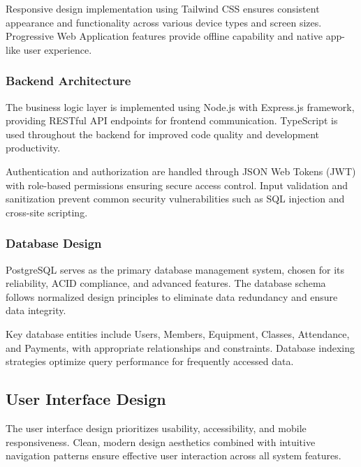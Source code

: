 \documentclass[12pt,a4paper]{report}
\begin{document}
Responsive design implementation using Tailwind CSS ensures consistent appearance and functionality across various device types and screen sizes. Progressive Web Application features provide offline capability and native app-like user experience.

\subsubsection{Backend Architecture}

The business logic layer is implemented using Node.js with Express.js framework, providing RESTful API endpoints for frontend communication. TypeScript is used throughout the backend for improved code quality and development productivity.

Authentication and authorization are handled through JSON Web Tokens (JWT) with role-based permissions ensuring secure access control. Input validation and sanitization prevent common security vulnerabilities such as SQL injection and cross-site scripting.

\subsubsection{Database Design}

PostgreSQL serves as the primary database management system, chosen for its reliability, ACID compliance, and advanced features. The database schema follows normalized design principles to eliminate data redundancy and ensure data integrity.

Key database entities include Users, Members, Equipment, Classes, Attendance, and Payments, with appropriate relationships and constraints. Database indexing strategies optimize query performance for frequently accessed data.


\subsection{User Interface Design}

The user interface design prioritizes usability, accessibility, and mobile responsiveness. Clean, modern design aesthetics combined with intuitive navigation patterns ensure effective user interaction across all system features.
\end{document}
